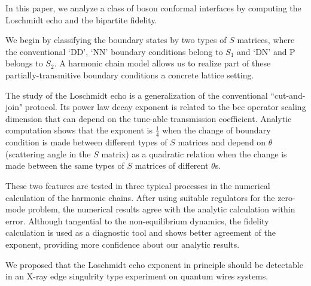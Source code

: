 
In this paper, we analyze a class of boson conformal interfaces by computing the Loschmidt echo and the bipartite fidelity. 

We begin by classifying the boundary states by two types of $S$ matrices, where the conventional `DD', `NN' boundary conditions belong to $S_1$ and  `DN' and P belongs to $S_2$. A harmonic chain model allows us to realize part of these partially-transmitive boundary conditions a concrete lattice setting. 

The study of the Loschmidt echo is a generalization of the conventional ``cut-and-join" protocol. Its power law decay exponent is related to the bcc operator scaling dimension that can depend on the tune-able transmission coefficient. Analytic computation shows that the exponent is $\frac{1}{4}$ when the change of boundary condition is made between different types of $S$ matrices and depend on $\theta$ (scattering angle in the $S$ matrix) as a quadratic relation when the change is made between the same types of $S$ matrices of different $\theta$s.

These two features are tested in three typical processes in the numerical calculation of the harmonic chains. After using suitable regulators for the zero-mode problem, the numerical results agree with the analytic calculation within error. Although tangential to the non-equilibrium dynamics, the fidelity calculation is used as a diagnostic tool and shows better agreement of the exponent, providing more confidence about our analytic results. 

We proposed that the Loschmidt echo exponent in principle should be detectable in an X-ray edge singulrity type experiment on quantum wires systems. 




